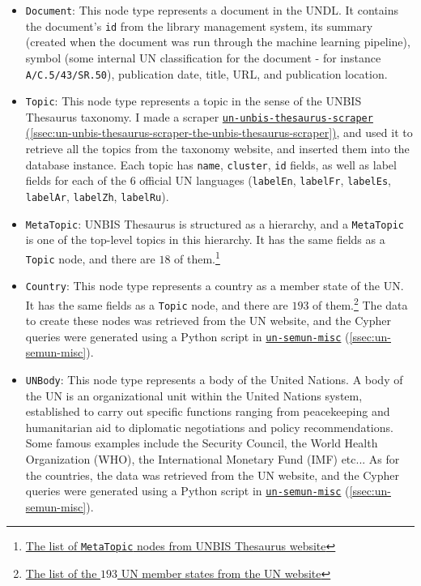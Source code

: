 \begin{itemize}
    \item \texttt{Document}:
          This node type represents a document in the UNDL. It contains the document's \texttt{id} from the library management system, its summary (created when the document was run through the machine learning pipeline), symbol (some internal UN classification for the document - for instance \texttt{A/C.5/43/SR.50}), publication date, title, URL, and publication location.

    \item \texttt{Topic}:
          This node type represents a topic in the sense of the UNBIS Thesaurus taxonomy. I made a scraper \href{https://github.com/ClementSicard/un-unbis-thesaurus-scraper}{\faGithub{} \texttt{un-unbis-thesaurus-scraper} (\ref{ssec:un-unbis-thesaurus-scraper-the-unbis-thesaurus-scraper})}, and used it to retrieve all the topics from the taxonomy website, and inserted them into the database instance. Each topic has \texttt{name}, \texttt{cluster}, \texttt{id} fields, as well as label fields for each of the $6$ official UN languages (\texttt{labelEn}, \texttt{labelFr}, \texttt{labelEs}, \texttt{labelAr}, \texttt{labelZh}, \texttt{labelRu}).

    \item \texttt{MetaTopic}:
          UNBIS Thesaurus is structured as a hierarchy, and a \texttt{MetaTopic} is one of the top-level topics in this hierarchy. It has the same fields as a \texttt{Topic} node, and there are $18$ of them.\footnote{\href{https://metadata.un.org/thesaurus/?lang=en}{The list of \texttt{MetaTopic} nodes from UNBIS Thesaurus website}}

    \item \texttt{Country}:
          This node type represents a country as a member state of the UN. It has the same fields as a \texttt{Topic} node, and there are $193$ of them.\footnote{\href{https://www.un.org/en/about-us/member-states}{The list of the $193$ UN member states from the UN website}} The data to create these nodes was retrieved from the UN website, and the Cypher queries were generated using a Python script in \href{https://github.com/ClementSicard/un-semun-misc}{\faGithub{} \texttt{un-semun-misc}} (\ref{ssec:un-semun-misc}).

    \item \texttt{UNBody}:
          This node type represents a body of the United Nations. A body of the UN is an organizational unit within the United Nations system, established to carry out specific functions ranging from peacekeeping and humanitarian aid to diplomatic negotiations and policy recommendations. Some famous examples include the Security Council, the World Health Organization (WHO), the International Monetary Fund (IMF) etc... As for the countries, the data was retrieved from the UN website, and the Cypher queries were generated using a Python script in \href{https://github.com/ClementSicard/un-semun-misc}{\faGithub{} \texttt{un-semun-misc}} (\ref{ssec:un-semun-misc}).


\end{itemize}

